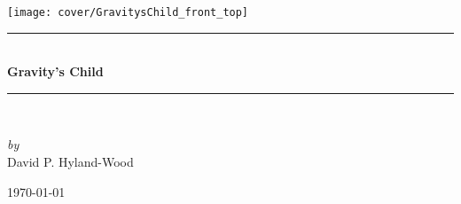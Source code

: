 \documentclass[12pt]{book} %
\newcommand{\HRule}{\rule{\linewidth}{0.5mm}}
\begin{document}
\begin{titlepage}
\begin{center}

\texttt{[image: cover/GravitysChild\_front\_top]}~\\[1cm]

\HRule \\[0.4cm]
{ \Huge \bfseries Gravity's Child \\[0.4cm] }
\HRule \\[1.5cm]

\noindent
\begin{minipage}{0.4\textwidth}
\begin{center} \large
\emph{by}\\
David P. Hyland-Wood
\end{center}
\end{minipage}%

\vfill

{\large \today}

\end{center}
\end{titlepage}

\pagestyle{fancy}
\fancyhf{}
\lhead[]{\thepage}
\rhead[\thepage]{}
\doublespacing

\frontmatter






\newpage
\renewcommand{\cftchapdotsep}{\cftdotsep}
\tableofcontents
\end{document}
